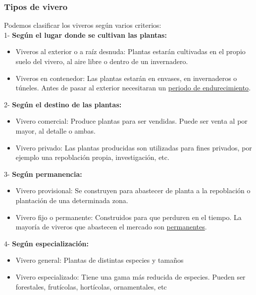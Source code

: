 \documentclass[a4paper,12pt,oneside]{article}
\begin{document}
\subsubsection{Tipos de vivero}
\label{sec:org8cb013e}
Podemos clasificar los viveros según varios criterios:\\
1- \textbf{Según el lugar donde se cultivan las plantas:}
\begin{itemize}
\item Viveros al exterior o a raíz desnuda: Plantas estarán cultivadas en el propio
suelo del vivero, al aire libre o dentro de un invernadero.
\item Viveros en contenedor: Las plantas estarán en envases, en invernaderos o
túneles. Antes de pasar al exterior necesitaran un \uline{periodo de
endurecimiento}.
\end{itemize}
2- \textbf{Según el destino de las plantas:}
\begin{itemize}
\item Vivero comercial: Produce plantas para ser vendidas. Puede ser venta al por
mayor, al detalle o ambas.
\item Vivero privado: Las plantas producidas son utilizadas para fines privados, por
ejemplo una repoblación propia, investigación, etc.
\end{itemize}

3- \textbf{Según permanencia:}
\begin{itemize}
\item Vivero provisional: Se construyen para abastecer de planta a la repoblación o
plantación de una determinada zona.
\item Vivero fijo o permanente: Construidos para que perduren en el tiempo. La
mayoría de viveros que abastecen el mercado son \uline{permanentes}.
\end{itemize}
4- \textbf{Según especialización:}
\begin{itemize}
\item Vivero general: Plantas de distintas especies y tamaños
\item Vivero especializado: Tiene una gama más reducida de especies. Pueden ser
forestales, frutícolas, hortícolas, ornamentales, etc
\end{itemize}
\end{document}
